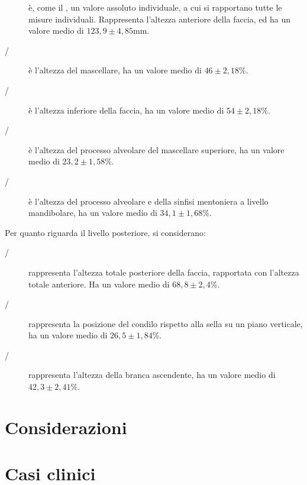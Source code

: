\begin{description}
\item[] è, come il , un valore assoluto individuale, a cui si rapportano tutte le misure individuali. Rappresenta l'altezza anteriore della faccia, ed ha un valore medio di $123,9 \pm 4,85$mm.
\item[/] è l'altezza del mascellare, ha un valore medio di $46 \pm 2,18$\%.
\item[/] è l'altezza inferiore della faccia, ha un valore medio di $54 \pm 2,18$\%.
\item[/] è l'altezza del processo alveolare del mascellare superiore, ha un valore medio di $23,2 \pm 1,58$\%.
\item[/] è l'altezza del processo alveolare e della sinfisi mentoniera a livello mandibolare, ha un valore medio di $34,1 \pm 1,68$\%.
\end{description}

Per quanto riguarda il livello posteriore, si considerano:

\begin{description}
\item[/] rappresenta l'altezza totale posteriore della faccia, rapportata con l'altezza totale anteriore. Ha un valore medio di $68,8 \pm 2,4$\%.
\item[/] rappresenta la posizione del condilo rispetto alla sella su un piano verticale, ha un valore medio di $26,5 \pm 1,84$\%.
\item[/] rappresenta l'altezza della branca ascendente, ha un valore medio di $42,3 \pm 2,41$\%.
\end{description}

\section{Considerazioni}

\section{Casi clinici}
